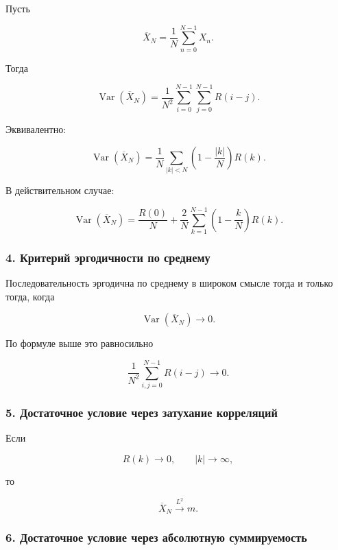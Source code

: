 \documentclass[
  11pt,
  a4paper,
]{article}
\begin{document}
Пусть

\[
\overline X_N=\frac1N\sum_{n=0}^{N-1}X_n.
\]

Тогда

\[
\operatorname{Var}(\overline X_N)
=
\frac1{N^2}
\sum_{i=0}^{N-1}\sum_{j=0}^{N-1}R(i-j).
\]

Эквивалентно:

\[
\operatorname{Var}(\overline X_N)
=
\frac1N
\sum_{|k|<N}
\left(1-\frac{|k|}{N}\right)R(k).
\]

В действительном случае:

\[
\operatorname{Var}(\overline X_N)
=
\frac{R(0)}{N}
+
\frac{2}{N}\sum_{k=1}^{N-1}
\left(1-\frac{k}{N}\right)R(k).
\]

\subsubsection{4. Критерий эргодичности по
среднему}\label{ux43aux440ux438ux442ux435ux440ux438ux439-ux44dux440ux433ux43eux434ux438ux447ux43dux43eux441ux442ux438-ux43fux43e-ux441ux440ux435ux434ux43dux435ux43cux443}

Последовательность эргодична по среднему в широком смысле тогда и только
тогда, когда

\[
\operatorname{Var}(\overline X_N)\to0.
\]

По формуле выше это равносильно

\[
\frac1{N^2}
\sum_{i,j=0}^{N-1}R(i-j)\to0.
\]

\subsubsection{5. Достаточное условие через затухание
корреляций}\label{ux434ux43eux441ux442ux430ux442ux43eux447ux43dux43eux435-ux443ux441ux43bux43eux432ux438ux435-ux447ux435ux440ux435ux437-ux437ux430ux442ux443ux445ux430ux43dux438ux435-ux43aux43eux440ux440ux435ux43bux44fux446ux438ux439}

Если

\[
R(k)\to0,
\qquad
|k|\to\infty,
\]

то

\[
\overline X_N\xrightarrow{L^2}m.
\]

\subsubsection{6. Достаточное условие через абсолютную
суммируемость}\label{ux434ux43eux441ux442ux430ux442ux43eux447ux43dux43eux435-ux443ux441ux43bux43eux432ux438ux435-ux447ux435ux440ux435ux437-ux430ux431ux441ux43eux43bux44eux442ux43dux443ux44e-ux441ux443ux43cux43cux438ux440ux443ux435ux43cux43eux441ux442ux44c}
\end{document}
